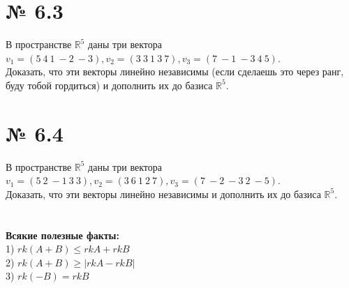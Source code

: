\documentclass[a4paper,11pt]{report}
\begin{document}
\section{№ 6.3}
В пространстве $\mathbb{R}^5$ даны три вектора $v_1 = (5\ 4\ 1\ -2\ -3), v_2 = (3\ 3\ 1\ 3\ 7), v_3 = (7\ -1\ -3\ 4\ 5)$.\\
Доказать, что эти векторы линейно независимы (если сделаешь это через ранг, буду тобой гордиться) и дополнить их
до базиса $\mathbb{R}^5$.
\section{№ 6.4}
В пространстве $\mathbb{R}^5$ даны три вектора $v_1 = (5\ 2\ -1\ 3\ 3), v_2 = (3\ 6\ 1\ 2\ 7), v_3 = (7\ -2\ -3\ 2\ -5)$.\\
Доказать, что эти векторы линейно независимы и дополнить их до базиса $\mathbb{R}^5$.
\\
\\
\\
\textbf{Всякие полезные факты:}\\
1) $rk(A + B) \leqslant rkA + rkB$\\
2) $rk(A + B) \geqslant |rkA - rkB|$\\
3) $rk(-B) = rkB$\\
\end{document}
